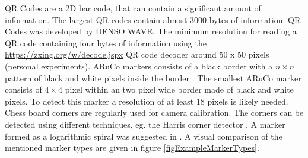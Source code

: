 \documentclass{article}
\begin{document}
QR Codes are a 2D bar code, that can contain a significant amount of information.
The largest QR codes contain almost 3000 bytes of information.
QR Codes was developed by DENSO WAVE.
The minimum resolution for reading a QR code containing four bytes of information using the \url{https://zxing.org/w/decode.jspx} QR code decoder around 50 x 50 pixels (personal experiments).
ARuCo markers consists of a black border with a $n \times n$ pattern of black and white pixels inside the border \cite{Garrido-Jurado2014}.
The smallest ARuCo marker consists of $4 \times 4$ pixel within an two pixel wide border made of black and white pixels.
To detect this marker a resolution of at least 18 pixels is likely needed.
Chess board corners are regularly used for camera calibration.
The corners can be detected using different techniques, eg. the Harris corner detector \cite{Harris1988}.
A marker formed as a logarithmic spiral was suggested in \cite{Karlsson2011}.
A visual comparison of the mentioned marker types are given
in figure \ref{figExampleMarkerTypes}.
\end{document}

